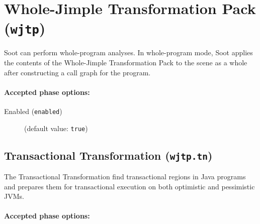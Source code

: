 \documentclass{article}
\begin{document}
\section{Whole-Jimple Transformation Pack ({\tt wjtp})}


\par

Soot can perform whole-program analyses.  In whole-program mode,
Soot applies the contents of the Whole-Jimple Transformation Pack
to the scene as a whole after constructing a call graph for the
program.
                        

\paragraph{Accepted phase options:} 

\begin{description}

\item[Enabled ({\tt enabled})]
(default value: {\tt true})






\end{description}

\subsection{Transactional Transformation ({\tt wjtp.tn})}

The Transactional Transformation find transactional regions in
Java programs and prepares them for transactional execution on
both optimistic and pessimistic JVMs.


\paragraph{Accepted phase options:} 
\end{document}
